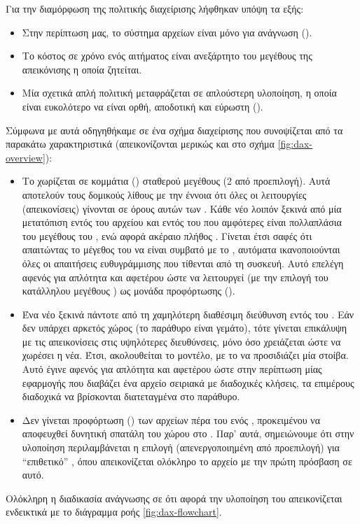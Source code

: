 Για την διαμόρφωση της πολιτικής διαχείρισης λήφθηκαν υπόψη τα εξής:
\begin{itemize}
    \item Στην περίπτωση μας, το σύστημα αρχείων είναι μόνο για ανάγνωση
          ().
    \item Το κόστος σε χρόνο ενός αιτήματος  είναι
          ανεξάρτητο του μεγέθους της απεικόνισης η οποία ζητείται.
    \item Μία σχετικά απλή πολιτική μεταφράζεται σε απλούστερη υλοποίηση,
          η οποία είναι ευκολότερο να είναι ορθή, αποδοτική και εύρωστη
          ().
\end{itemize}
Σύμφωνα με αυτά οδηγηθήκαμε σε ένα σχήμα διαχείρισης που συνοψίζεται από τα
παρακάτω χαρακτηριστικά (απεικονίζονται μερικώς και στο σχήμα
\ref{fig:dax-overview}):
\begin{itemize}
    \item Το  χωρίζεται σε κομμάτια (\emph{}) σταθερού
          μεγέθους (2  από προεπιλογή). Αυτά αποτελούν τους δομικούς
          λίθους με την έννοια ότι όλες οι λειτουργίες (απεικονίσεις) γίνονται
          σε όρους αυτών των . Κάθε νέο  λοιπόν ξεκινά
          από μία μετατόπιση εντός του αρχείου και εντός του  που
          αμφότερες είναι πολλαπλάσια του μεγέθους του , ενώ αφορά
          ακέραιο πλήθος . Γίνεται έτσι σαφές ότι απαιτώντας το
          μέγεθος του  να είναι συμβατό με το ,
          αυτόματα ικανοποιούνται όλες οι απαιτήσεις ευθυγράμμισης που τίθενται
          από τη \viofs{} συσκευή. Αυτό επελέγη αφενός για απλότητα και αφετέρου
          ώστε να λειτουργεί (με την επιλογή του κατάλληλου μεγέθους )
          ως μονάδα προφόρτωσης ().
    \item Ένα νέο  ξεκινά πάντοτε από τη χαμηλότερη διαθέσιμη
          διεύθυνση εντός του . Εάν δεν υπάρχει αρκετός χώρος
          (το παράθυρο είναι γεμάτο), τότε γίνεται επικάλυψη με τις απεικονίσεις
          στις υψηλότερες διευθύνσεις, μόνο όσο χρειάζεται ώστε να χωρέσει η
          νέα. Έτσι, ακολουθείται το  μοντέλο,
          με το  να προσιδιάζει μία στοίβα. Αυτό έγινε αφενός
          για απλότητα και αφετέρου ώστε στην περίπτωση μίας εφαρμογής που
          διαβάζει ένα αρχείο σειριακά με διαδοχικές κλήσεις, τα επιμέρους
          διαδοχικά  να βρίσκονται διατεταγμένα στο παράθυρο.
    \item Δεν γίνεται προφόρτωση () των αρχείων πέρα του
          ενός , προκειμένου να αποφευχθεί δυνητική σπατάλη του χώρου
          στο . Παρ' αυτά, σημειώνουμε ότι στην υλοποίηση
          περιλαμβάνεται η επιλογή (απενεργοποιημένη από προεπιλογή) για
          ``επιθετικό'' , όπου απεικονίζεται ολόκληρο το αρχείο
          με την πρώτη πρόσβαση σε αυτό.
\end{itemize}
Ολόκληρη η διαδικασία ανάγνωσης σε ότι αφορά την υλοποίηση του \viofs{}
απεικονίζεται ενδεικτικά με το διάγραμμα ροής \ref{fig:dax-flowchart}.

